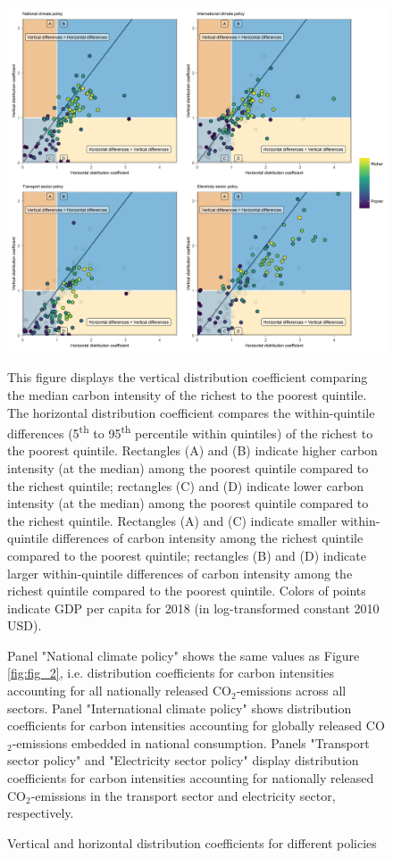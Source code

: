 \documentclass[12pt, a4paper]{article}
\newenvironment{subcaption2}
{\strut
\vspace{-5pt}
\begin{minipage}[b]{0.9\textwidth}
  \hspace*{-\parindent}
  \footnotesize}
 {\end{minipage}}
\begin{document}
\begin{figure}[ht!]
    \centering
    \caption{Vertical and horizontal distribution coefficients for different policies}
    \includegraphics[width=\textwidth]{1_Figures/Figure 2/Figure_2_2017_Policy.jpg}
    \label{fig:comparison_policies}
    \begin{subcaption2}
    This figure displays the vertical distribution coefficient comparing the median carbon intensity of the richest to the poorest quintile. The horizontal distribution coefficient compares the within-quintile differences (5\textsuperscript{th} to 95\textsuperscript{th} percentile within quintiles) of the richest to the poorest quintile. Rectangles (A) and (B) indicate higher carbon intensity (at the median) among the poorest quintile compared to the richest quintile; rectangles (C) and (D) indicate lower carbon intensity (at the median) among the poorest quintile compared to the richest quintile. Rectangles (A) and (C) indicate smaller within-quintile differences of carbon intensity among the richest quintile compared to the poorest quintile; rectangles (B) and (D) indicate larger within-quintile differences of carbon intensity among the richest quintile compared to the poorest quintile. Colors of points indicate GDP per capita for 2018 (in log-transformed constant 2010 USD).
    
    Panel "National climate policy" shows the same values as Figure \ref{fig:fig_2}, i.e. distribution coefficients for carbon intensities accounting for all nationally released CO$_{2}$-emissions across all sectors. Panel "International climate policy" shows distribution coefficients for carbon intensities accounting for globally released CO$_{2}$-emissions embedded in national consumption. Panels "Transport sector policy" and "Electricity sector policy" display distribution coefficients for carbon intensities accounting for nationally released CO$_{2}$-emissions in the transport sector and electricity sector, respectively.
    \end{subcaption2}
\end{figure}
\end{document}
